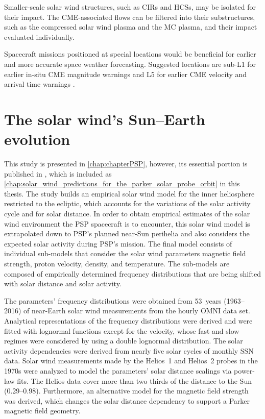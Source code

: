 Smaller-scale solar wind structures, such as CIRs and HCSs, may be isolated for their \Kp{} impact. The CME-associated flows can be filtered into their substructures, such as the compressed solar wind plasma and the MC plasma, and their \Kp{} impact evaluated individually.

Spacecraft missions positioned at special locations would be beneficial for earlier and more accurate space weather forecasting. Suggested locations are sub-L1 for earlier in-situ CME magnitude warnings and L5 for earlier CME velocity and arrival time warnings \citep{Vourlidas2015}.

\clearpage


\section{The solar wind's Sun--Earth evolution}
This study is presented in \autoref{chap:chapterPSP}, however, its essential portion is published in \citet{Venzmer2018}, which is included as \autoref{chap:solar_wind_predictions_for_the_parker_solar_probe_orbit} in this thesis.
The study builds an empirical solar wind model for the inner heliosphere restricted to the ecliptic, which accounts for the variations of the solar activity cycle and for solar distance. In order to obtain empirical estimates of the solar wind environment the PSP spacecraft is to encounter, this solar wind model is extrapolated down to PSP's planned near-Sun perihelia and also considers the expected solar activity during PSP's mission.
The final model consists of individual sub-models that consider the solar wind parameters magnetic field strength, proton velocity, density, and temperature. The sub-models are composed of empirically determined frequency distributions that are being shifted with solar distance and solar activity.

The parameters' frequency distributions were obtained from 53~years (1963--2016) of near-Earth solar wind measurements from the hourly OMNI data set. Analytical representations of the frequency distributions were derived and were fitted with lognormal functions except for the velocity, whose fast and slow regimes were considered by using a double lognormal distribution. The solar activity dependencies were derived from nearly five solar cycles of monthly SSN data. Solar wind measurements made by the Helios~1 and Helios~2 probes in the 1970s were analyzed to model the parameters' solar distance scalings via power-law fits. The Helios data cover more than two thirds of the distance to the Sun (\SIrange{0.29}{0.98}{\au}). Furthermore, an alternative model for the magnetic field strength was derived, which changes the solar distance dependency to support a Parker magnetic field geometry.

